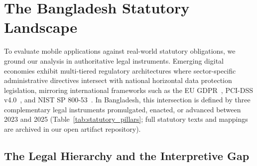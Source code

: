 \section{The Bangladesh Statutory Landscape}
\label{sec:statutory}

To evaluate mobile applications against real-world statutory obligations, we ground our analysis in authoritative legal instruments. Emerging digital economies exhibit multi-tiered regulatory architectures where sector-specific administrative directives intersect with national horizontal data protection legislation, mirroring international frameworks such as the EU GDPR~\cite{gdpr_2016}, PCI-DSS v4.0~\cite{pci_dss_v4}, and NIST SP 800-53~\cite{nist_sp800_53}. In Bangladesh, this intersection is defined by three complementary legal instruments promulgated, enacted, or advanced between 2023 and 2025 (Table~\ref{tab:statutory_pillars}; full statutory texts and mappings are archived in our open artifact repository).

\begin{table}[t]
\centering
\small
\caption{\textbf{The Statutory Tri-Pillar}: Authoritative legal instruments governing mobile digital services in Bangladesh.}
\label{tab:statutory_pillars}
\end{table}

\subsection{The Legal Hierarchy and the Interpretive Gap}
\label{sec:statutory:interpretive_gap}

